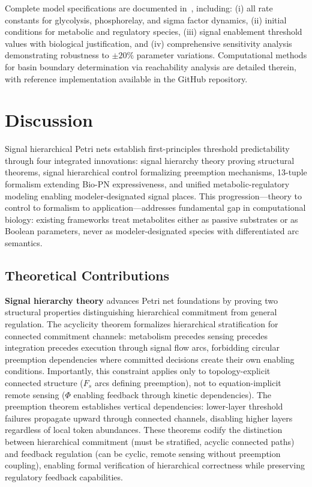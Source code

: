 \documentclass[10pt,letterpaper]{article}
\begin{document}
Complete model specifications are documented in~\cite{subtilis2026}, including: (i) all rate constants for glycolysis, phosphorelay, and sigma factor dynamics, (ii) initial conditions for metabolic and regulatory species, (iii) signal enablement threshold values with biological justification, and (iv) comprehensive sensitivity analysis demonstrating robustness to $\pm 20\%$ parameter variations. Computational methods for basin boundary determination via reachability analysis are detailed therein, with reference implementation available in the GitHub repository.

\section{Discussion}
\label{sec:discussion}

Signal hierarchical Petri nets establish first-principles threshold predictability through four integrated innovations: signal hierarchy theory proving structural theorems, signal hierarchical control formalizing preemption mechanisms, 13-tuple formalism extending Bio-PN expressiveness, and unified metabolic-regulatory modeling enabling modeler-designated signal places. This progression---theory to control to formalism to application---addresses fundamental gap in computational biology: existing frameworks treat metabolites either as passive substrates or as Boolean parameters, never as modeler-designated species with differentiated arc semantics.

\subsection{Theoretical Contributions}

\textbf{Signal hierarchy theory} advances Petri net foundations by proving two structural properties distinguishing hierarchical commitment from general regulation. The acyclicity theorem formalizes hierarchical stratification for connected commitment channels: metabolism precedes sensing precedes integration precedes execution through signal flow arcs, forbidding circular preemption dependencies where committed decisions create their own enabling conditions. Importantly, this constraint applies only to topology-explicit connected structure ($F_s$ arcs defining preemption), not to equation-implicit remote sensing ($\Phi$ enabling feedback through kinetic dependencies). The preemption theorem establishes vertical dependencies: lower-layer threshold failures propagate upward through connected channels, disabling higher layers regardless of local token abundances. These theorems codify the distinction between hierarchical commitment (must be stratified, acyclic connected paths) and feedback regulation (can be cyclic, remote sensing without preemption coupling), enabling formal verification of hierarchical correctness while preserving regulatory feedback capabilities.
\end{document}
